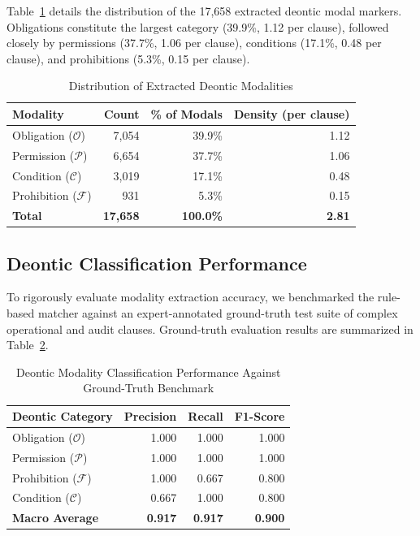 \documentclass[conference]{IEEEtran}
\begin{document}
Table~\ref{tab:deontic_dist} details the distribution of the 17,658 extracted deontic modal markers. Obligations constitute the largest category (39.9\%, 1.12 per clause), followed closely by permissions (37.7\%, 1.06 per clause), conditions (17.1\%, 0.48 per clause), and prohibitions (5.3\%, 0.15 per clause).

\begin{table}[t]
\caption{Distribution of Extracted Deontic Modalities}
\label{tab:deontic_dist}
\centering
\begin{tabular}{lrrr}
\toprule
\textbf{Modality} & \textbf{Count} & \textbf{\% of Modals} & \textbf{Density (per clause)} \\
\midrule
Obligation ($\mathcal{O}$) & 7,054 & 39.9\% & 1.12 \\
Permission ($\mathcal{P}$) & 6,654 & 37.7\% & 1.06 \\
Condition ($\mathcal{C}$) & 3,019 & 17.1\% & 0.48 \\
Prohibition ($\mathcal{F}$) & 931 & 5.3\% & 0.15 \\
\midrule
\textbf{Total} & \textbf{17,658} & \textbf{100.0\%} & \textbf{2.81} \\
\bottomrule
\end{tabular}
\end{table}

\subsection{Deontic Classification Performance}
To rigorously evaluate modality extraction accuracy, we benchmarked the rule-based matcher against an expert-annotated ground-truth test suite of complex operational and audit clauses. Ground-truth evaluation results are summarized in Table~\ref{tab:deontic_accuracy}.

\begin{table}[t]
\caption{Deontic Modality Classification Performance Against Ground-Truth Benchmark}
\label{tab:deontic_accuracy}
\centering
\begin{tabular}{lrrr}
\toprule
\textbf{Deontic Category} & \textbf{Precision} & \textbf{Recall} & \textbf{F1-Score} \\
\midrule
Obligation ($\mathcal{O}$) & 1.000 & 1.000 & 1.000 \\
Permission ($\mathcal{P}$) & 1.000 & 1.000 & 1.000 \\
Prohibition ($\mathcal{F}$) & 1.000 & 0.667 & 0.800 \\
Condition ($\mathcal{C}$) & 0.667 & 1.000 & 0.800 \\
\midrule
\textbf{Macro Average} & \textbf{0.917} & \textbf{0.917} & \textbf{0.900} \\
\bottomrule
\end{tabular}
\end{table}
\end{document}
